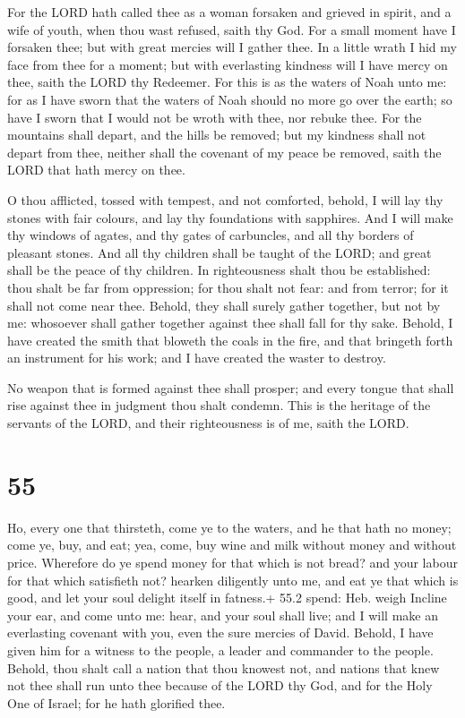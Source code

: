  For the LORD hath called thee as a woman forsaken and
grieved in spirit, and a wife of youth, when thou wast refused, saith
thy God.  For a small moment have I forsaken thee; but with
great mercies will I gather thee.  In a little wrath I hid
my face from thee for a moment; but with everlasting kindness will I
have mercy on thee, saith the LORD thy Redeemer.  For this
is as the waters of Noah unto me: for as I have sworn that the waters of
Noah should no more go over the earth; so have I sworn that I would not
be wroth with thee, nor rebuke thee.  For the mountains
shall depart, and the hills be removed; but my kindness shall not depart
from thee, neither shall the covenant of my peace be removed, saith the
LORD that hath mercy on thee.

 O thou afflicted, tossed with tempest, and not
comforted, behold, I will lay thy stones with fair colours, and lay thy
foundations with sapphires.  And I will make thy windows of
agates, and thy gates of carbuncles, and all thy borders of pleasant
stones.  And all thy children shall be taught of the LORD;
and great shall be the peace of thy children.  In
righteousness shalt thou be established: thou shalt be far from
oppression; for thou shalt not fear: and from terror; for it shall not
come near thee.  Behold, they shall surely gather together,
but not by me: whosoever shall gather together against thee shall fall
for thy sake.  Behold, I have created the smith that
bloweth the coals in the fire, and that bringeth forth an instrument for
his work; and I have created the waster to destroy.

 No weapon that is formed against thee shall prosper; and
every tongue that shall rise against thee in judgment thou shalt
condemn. This is the heritage of the servants of the LORD, and their
righteousness is of me, saith the LORD.

\hypertarget{section-54}{%
\section{55}\label{section-54}}

 Ho, every one that thirsteth, come ye to the waters, and he
that hath no money; come ye, buy, and eat; yea, come, buy wine and milk
without money and without price.  Wherefore do ye spend
money for that which is not bread? and your labour for that which
satisfieth not? hearken diligently unto me, and eat ye that which is
good, and let your soul delight itself in fatness.+ 55.2 spend: Heb.
weigh  Incline your ear, and come unto me: hear, and your
soul shall live; and I will make an everlasting covenant with you, even
the sure mercies of David.  Behold, I have given him for a
witness to the people, a leader and commander to the people.
 Behold, thou shalt call a nation that thou knowest not, and
nations that knew not thee shall run unto thee because of the LORD thy
God, and for the Holy One of Israel; for he hath glorified thee.

